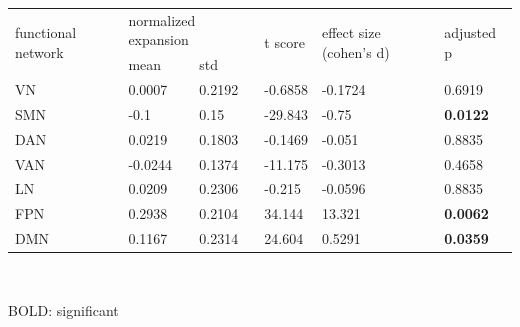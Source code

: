 \begin{refsection}
\begin{table}[H]
\small
\centering
{}\selectfont
{} \label{table3S1} 
\begin{tabular}{llllll}
\hline
\multirow{2}{*}{functional network} & \multicolumn{2}{l}{normalized expansion} & \multirow{2}{*}{t score} & \multirow{2}{*}{effect size (cohen's d)} & \multirow{2}{*}{adjusted p} \\ \cline{2-3}
                                    & mean                     & std                    &                          &                                          &                                   \\ \hline 
VN                                  & 0.0007                   & 0.2192                 & -0.6858                  & -0.1724                                  & 0.6919                            \\
SMN                                 & -0.1                     & 0.15                   & -29.843                  & -0.75                                    & \textbf{0.0122}                            \\
DAN                                 & 0.0219                   & 0.1803                 & -0.1469                  & -0.051                                   & 0.8835                            \\
VAN                                 & -0.0244                  & 0.1374                 & -11.175                  & -0.3013                                  & 0.4658                            \\
LN                                  & 0.0209                   & 0.2306                 & -0.215                   & -0.0596                                  & 0.8835                            \\
FPN                                 & 0.2938                   & 0.2104                 & 34.144                   & 13.321                                   & \textbf{0.0062}                            \\
DMN                                 & 0.1167                   & 0.2314                 & 24.604                   & 0.5291                                   & \textbf{0.0359}                            \\ \hline
\end{tabular}\\
{\begin{flushleft}
\scriptsize BOLD: significant
\end{flushleft}}
\end{table}



\end{refsection}
